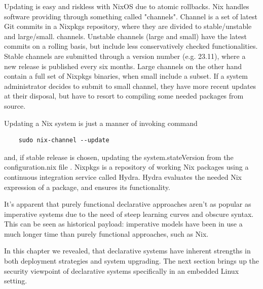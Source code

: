 Updating is easy and riskless with NixOS due to atomic
rollbacks. Nix handles software providing through something called
"channels". Channel is a set of latest Git commits in a Nixpkgs
repository, where they are divided to stable/unstable and
large/small. channels. Unstable channels (large and small) have the
latest commits on a rolling basis, but include less conservatively
checked functionalities. Stable channels are submitted through a
version number (e.g. 23.11), where a new release is published every
six months. Large channels on the other hand contain a full set of
Nixpkgs binaries, when small include a subset. If a system
administrator decides to submit to small channel, they have more
recent updates at their disposal, but have to resort to compiling some
needed packages from source. \cite{nixosChannelsNixOS}

Updating a Nix system is just a manner of invoking command

\begin{lstlisting}
    sudo nix-channel --update
\end{lstlisting}

and, if stable release is chosen, updating the system.stateVersion
from the configuration.nix file \cite{nixosNixOSManual}. Nixpkgs is a
repository of working Nix packages using a continuous integration
service called Hydra. Hydra evaluates the needed Nix expression of a
package, and ensures its functionality. \cite{nixosNixOSManual}

It's apparent that purely functional declarative approaches aren't as popular
as imperative systems due to the need of steep learning curves and
obscure syntax. This can be seen as historical payload: imperative
models have been in use a much longer time than purely functional
approaches, such as Nix.

In this chapter we revealed, that declarative systems have inherent
strengths in both deployment strategies and system upgrading. The next
section brings up the security viewpoint of declarative systems
specifically in an embedded Linux setting.

